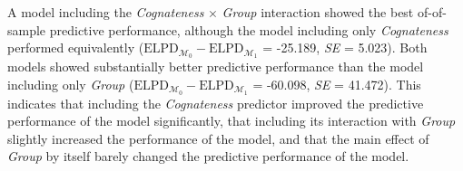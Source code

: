 \documentclass[
  letterpaper,
  DIV=11,
  numbers=noendperiod]{scrartcl}
\begin{document}
A model including the \emph{Cognateness} \(\times\) \emph{Group}
interaction showed the best of-of-sample predictive performance,
although the model including only \emph{Cognateness} performed
equivalently
(\(\text{ELPD}_{\mathcal{M_0}} - \text{ELPD}_{\mathcal{M_1}}\) =
-25.189, \emph{SE} = 5.023). Both models showed substantially better
predictive performance than the model including only \emph{Group}
(\(\text{ELPD}_{\mathcal{M_0}} - \text{ELPD}_{\mathcal{M_1}}\) =
-60.098, \emph{SE} = 41.472). This indicates that including the
\emph{Cognateness} predictor improved the predictive performance of the
model significantly, that including its interaction with \emph{Group}
slightly increased the performance of the model, and that the main
effect of \emph{Group} by itself barely changed the predictive
performance of the model.
\end{document}
